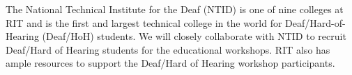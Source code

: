 \documentclass[11pt]{article}
\begin{document}



The National Technical Institute for the Deaf (NTID) is one of nine colleges at RIT and is the first and largest technical college in the world for Deaf/Hard-of-Hearing (Deaf/HoH) students. We will closely collaborate with NTID to recruit Deaf/Hard of Hearing students for the educational workshops. RIT also has ample resources to support the Deaf/Hard of Hearing workshop participants. 
\end{document}
